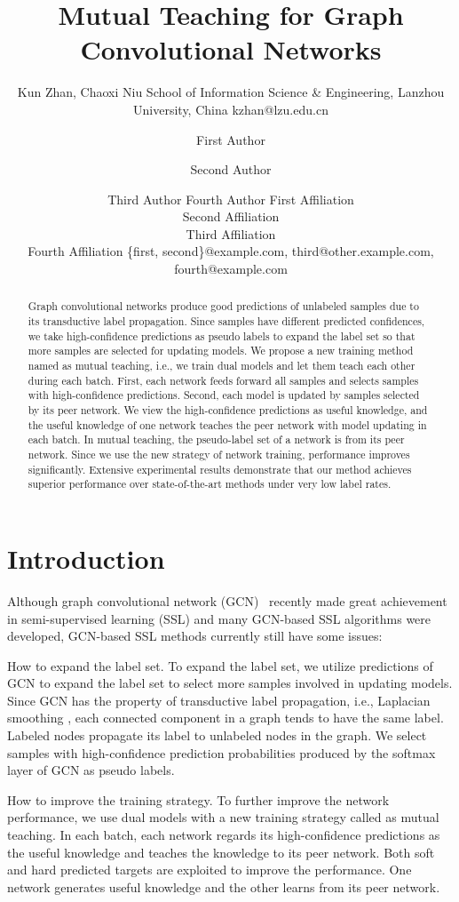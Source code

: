 \documentclass{article}
\title{Mutual Teaching for Graph Convolutional Networks}
\author{
Kun Zhan, Chaoxi Niu
    \affiliations
    School of Information Science \& Engineering, Lanzhou University, China
    \emails
    kzhan@lzu.edu.cn
}
\author{
First Author
\and
Second Author\and
Third Author\And
Fourth Author
\affiliations
First Affiliation\\
Second Affiliation\\
Third Affiliation\\
Fourth Affiliation
\emails
\{first, second\}@example.com,
third@other.example.com,
fourth@example.com
}
\begin{document}
\maketitle
\begin{abstract}
Graph convolutional networks produce good predictions of unlabeled samples due to its transductive label propagation. Since samples have different predicted confidences, we take high-confidence predictions as pseudo labels to expand the label set so that more samples are selected for updating models. We propose a new training method named as mutual teaching, i.e., we train dual models and let them teach each other during each batch. First, each network feeds forward all samples and selects samples with high-confidence predictions. Second, each model is updated by samples selected by its peer network. We view the high-confidence predictions as useful knowledge, and the useful knowledge of one network teaches the peer network with model updating in each batch. In mutual teaching, the pseudo-label set of a network is from its peer network. Since we use the new strategy of network training, performance improves significantly. Extensive experimental results demonstrate that our method achieves superior performance over state-of-the-art methods under very low label rates.
\end{abstract}


\section{Introduction}
Although graph convolutional network (GCN)~\cite{kipf2016semi} recently made great achievement in semi-supervised learning (SSL) and many GCN-based SSL algorithms were developed, GCN-based SSL methods currently still have some issues:

How to expand the label set. To expand the label set, we utilize predictions of GCN to expand the label set to select more samples involved in updating models. Since GCN has the property of transductive label propagation, i.e., Laplacian smoothing \cite{li2018deeper}, each connected component in a graph tends to have the same label. Labeled nodes propagate its label to unlabeled nodes in the graph. We select samples with high-confidence prediction probabilities produced by the {\rm softmax} layer of GCN as pseudo labels.

How to improve the training strategy. To further improve the network performance, we use dual models with a new training strategy called as mutual teaching. In each batch, each network regards its high-confidence predictions as the useful knowledge and teaches the knowledge to its peer network. Both soft and hard predicted targets are exploited to improve the performance. One network generates useful knowledge and the other learns from its peer network.
\end{document}

